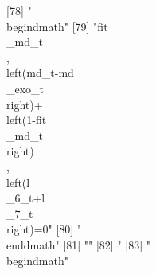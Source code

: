 [78] "\\begin{dmath}"                                                                                                                                                                                                                                                                                                                              
[79] "{{fit\\_md}_{t}}\\, \\left({md_{t}}-{{md\\_exo}_{t}}\\right)+\\left(1-{{fit\\_md}_{t}}\\right)\\, \\left({{l\\_6}_{t}}+{{l\\_7}_{t}}\\right)=0"                                                                                                                                                                                              
[80] "\\end{dmath}"                                                                                                                                                                                                                                                                                                                                
[81] ""                                                                                                                                                                                                                                                                                                                                            
[82] "%
[83] "\\begin{dmath}"                                                                                                                                                                                                                                                                                                                              
